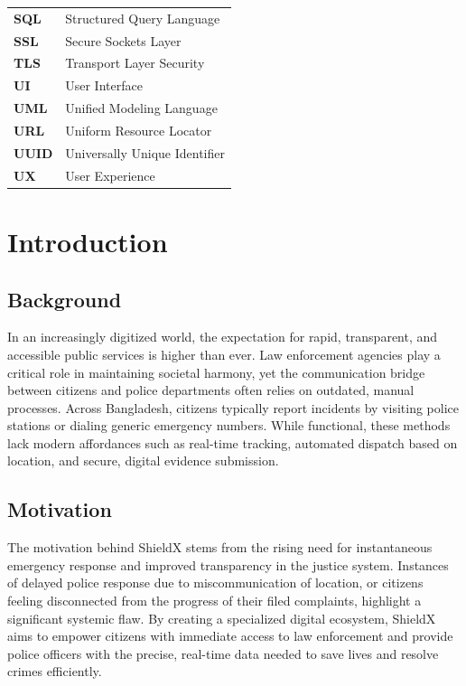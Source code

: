 \documentclass[12pt, a4paper, twoside, openany]{report}
\begin{document}
\begin{table}[ht]
\begin{tabularx}{\textwidth}{lX}
\textbf{SQL} & Structured Query Language \\
\textbf{SSL} & Secure Sockets Layer \\
\textbf{TLS} & Transport Layer Security \\
\textbf{UI} & User Interface \\
\textbf{UML} & Unified Modeling Language \\
\textbf{URL} & Uniform Resource Locator \\
\textbf{UUID} & Universally Unique Identifier \\
\textbf{UX} & User Experience \\
\end{tabularx}
\end{table}
\clearpage
\chapter{Introduction}
\section{Background}
In an increasingly digitized world, the expectation for rapid, transparent, and accessible public services is higher than ever. Law enforcement agencies play a critical role in maintaining societal harmony, yet the communication bridge between citizens and police departments often relies on outdated, manual processes. Across Bangladesh, citizens typically report incidents by visiting police stations or dialing generic emergency numbers. While functional, these methods lack modern affordances such as real-time tracking, automated dispatch based on location, and secure, digital evidence submission.
\section{Motivation}
The motivation behind ShieldX stems from the rising need for instantaneous emergency response and improved transparency in the justice system. Instances of delayed police response due to miscommunication of location, or citizens feeling disconnected from the progress of their filed complaints, highlight a significant systemic flaw. By creating a specialized digital ecosystem, ShieldX aims to empower citizens with immediate access to law enforcement and provide police officers with the precise, real-time data needed to save lives and resolve crimes efficiently.
\end{document}

